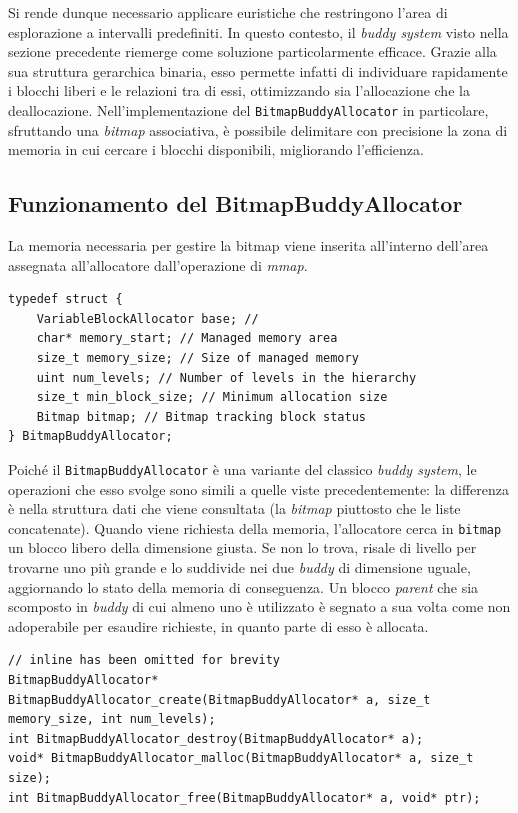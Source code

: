 Si rende dunque necessario applicare euristiche che restringono l’area di esplorazione a intervalli predefiniti. In questo contesto, il \textit{buddy system} visto nella sezione precedente riemerge come soluzione particolarmente efficace. Grazie alla sua struttura gerarchica binaria, esso permette infatti di individuare rapidamente i blocchi liberi e le relazioni tra di essi, ottimizzando sia l’allocazione che la deallocazione. Nell'implementazione del \texttt{BitmapBuddyAllocator} in particolare, sfruttando una \textit{bitmap} associativa, è possibile delimitare con precisione la zona di memoria in cui cercare i blocchi disponibili, migliorando l’efficienza.

\subsection*{Funzionamento del BitmapBuddyAllocator}
La memoria necessaria per gestire la bitmap viene inserita all'interno dell'area assegnata all'allocatore dall'operazione di \textit{mmap}.
\begin{lstlisting}
typedef struct {
    VariableBlockAllocator base; // 
    char* memory_start; // Managed memory area
    size_t memory_size; // Size of managed memory
    uint num_levels; // Number of levels in the hierarchy
    size_t min_block_size; // Minimum allocation size
    Bitmap bitmap; // Bitmap tracking block status
} BitmapBuddyAllocator;
\end{lstlisting}

Poiché il \texttt{BitmapBuddyAllocator} è una variante del classico \textit{buddy system}, le operazioni che esso svolge sono simili a quelle viste precedentemente: la differenza è nella struttura dati che viene consultata (la \textit{bitmap} piuttosto che le liste concatenate). Quando viene richiesta della memoria, l’allocatore cerca in \texttt{bitmap} un blocco libero della dimensione giusta. Se non lo trova, risale di livello per trovarne uno più grande e lo suddivide nei due \textit{buddy} di dimensione uguale, aggiornando lo stato della memoria di conseguenza. Un blocco \textit{parent} che sia scomposto in \textit{buddy} di cui almeno uno è utilizzato è segnato a sua volta come non adoperabile per esaudire richieste, in quanto parte di esso è allocata.

\begin{lstlisting}
// inline has been omitted for brevity
BitmapBuddyAllocator* BitmapBuddyAllocator_create(BitmapBuddyAllocator* a, size_t memory_size, int num_levels);
int BitmapBuddyAllocator_destroy(BitmapBuddyAllocator* a);
void* BitmapBuddyAllocator_malloc(BitmapBuddyAllocator* a, size_t size);
int BitmapBuddyAllocator_free(BitmapBuddyAllocator* a, void* ptr);
\end{lstlisting}

